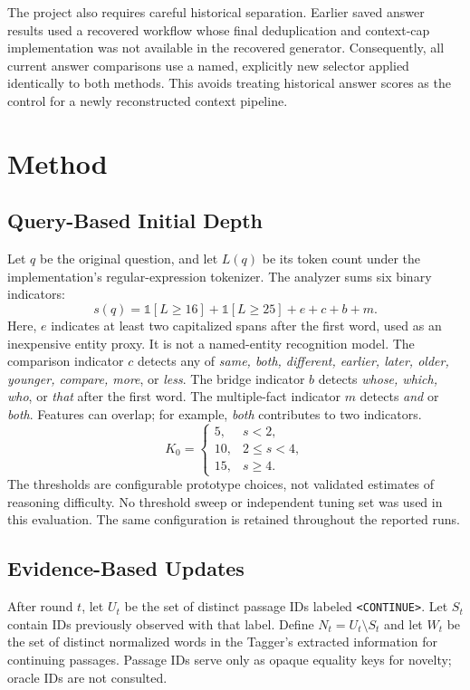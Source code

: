 \documentclass[conference]{IEEEtran}
\begin{document}
The project also requires careful historical separation. Earlier saved answer results used a recovered workflow whose final deduplication and context-cap implementation was not available in the recovered generator. Consequently, all current answer comparisons use a named, explicitly new selector applied identically to both methods. This avoids treating historical answer scores as the control for a newly reconstructed context pipeline.

\section{Method}
\subsection{Query-Based Initial Depth}
Let $q$ be the original question, and let $L(q)$ be its token count under the implementation's regular-expression tokenizer. The analyzer sums six binary indicators:
\begin{equation}
 s(q)=\mathbb{1}[L\geq16]+\mathbb{1}[L\geq25]+e+c+b+m.
\end{equation}
Here, $e$ indicates at least two capitalized spans after the first word, used as an inexpensive entity proxy. It is not a named-entity recognition model. The comparison indicator $c$ detects any of \emph{same, both, different, earlier, later, older, younger, compare, more}, or \emph{less}. The bridge indicator $b$ detects \emph{whose, which, who}, or \emph{that} after the first word. The multiple-fact indicator $m$ detects \emph{and} or \emph{both}. Features can overlap; for example, \emph{both} contributes to two indicators.
\begin{equation}
K_0=\begin{cases}5,&s<2,\\10,&2\leq s<4,\\15,&s\geq4.\end{cases}
\end{equation}
The thresholds are configurable prototype choices, not validated estimates of reasoning difficulty. No threshold sweep or independent tuning set was used in this evaluation. The same configuration is retained throughout the reported runs.

\subsection{Evidence-Based Updates}
After round $t$, let $U_t$ be the set of distinct passage IDs labeled \texttt{<CONTINUE>}. Let $S_t$ contain IDs previously observed with that label. Define $N_t=U_t\setminus S_t$ and let $W_t$ be the set of distinct normalized words in the Tagger's extracted information for continuing passages. Passage IDs serve only as opaque equality keys for novelty; oracle IDs are not consulted.
\end{document}
